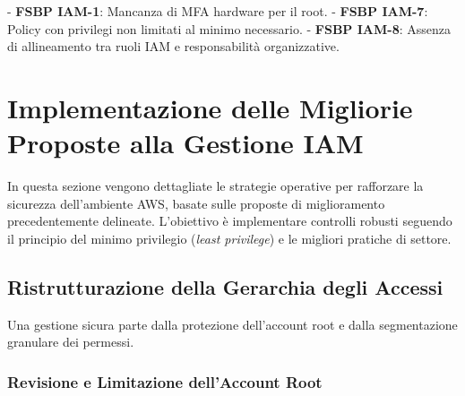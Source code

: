 - \textbf{FSBP IAM-1}: Mancanza di MFA hardware per il root\cite{ref3}.
- \textbf{FSBP IAM-7}: Policy con privilegi non limitati al minimo necessario\cite{ref5}.
- \textbf{FSBP IAM-8}: Assenza di allineamento tra ruoli IAM e responsabilità organizzative\cite{ref2}.
\section{Implementazione delle Migliorie Proposte alla Gestione IAM}
\label{sec:implementazione_migliorie}

In questa sezione vengono dettagliate le strategie operative per rafforzare la sicurezza dell'ambiente AWS, basate sulle proposte di miglioramento precedentemente delineate. L'obiettivo è implementare controlli robusti seguendo il principio del minimo privilegio (\emph{least privilege}) e le migliori pratiche di settore.

\subsection{Ristrutturazione della Gerarchia degli Accessi}

Una gestione sicura parte dalla protezione dell'account root e dalla segmentazione granulare dei permessi.

\subsubsection{Revisione e Limitazione dell'Account Root}

